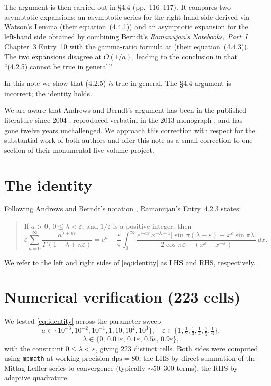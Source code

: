 \documentclass[11pt,reqno]{amsart}
\theoremstyle{definition}
\newcommand{\LHS}{\mathrm{LHS}}
\newcommand{\RHS}{\mathrm{RHS}}
\newcommand{\dps}{\mathrm{dps}}
\begin{document}
The argument is then carried out in \S4.4 (pp.~116--117). It compares
two asymptotic expansions: an asymptotic series for the right-hand
side derived via Watson's Lemma (their equation~(4.4.1)) and an
asymptotic expansion for the left-hand side obtained by combining
Berndt's \emph{Ramanujan's Notebooks, Part~I} Chapter~3 Entry~10
\cite{BerndtNB1} with the gamma-ratio formula at
\cite[p.~116, eq.~(4.4.2)]{AB2013} (their equation~(4.4.3)). The two
expansions disagree at $O(1/a)$, leading to the conclusion in
\cite[p.~117]{AB2013} that ``(4.2.5) cannot be true in general.''

In this note we show that (4.2.5) \emph{is} true in general. The
\S4.4 argument is incorrect; the identity holds.

We are aware that Andrews and Berndt's argument has been in the
published literature since 2004 \cite{Berndt2004}, reproduced
verbatim in the 2013 monograph \cite{AB2013}, and has gone twelve
years unchallenged. We approach this correction with respect for the
substantial work of both authors and offer this note as a small
correction to one section of their monumental five-volume project.

\section{The identity}

Following Andrews and Berndt's notation
\cite[p.~113, eq.~(4.2.5)]{AB2013}, Ramanujan's Entry~4.2.3 states:
\begin{quote}
If $a > 0$, $0 \le \lambda < \varepsilon$, and $1/\varepsilon$ is a
positive integer, then
\begin{equation}\label{eq:identity}
\varepsilon \sum_{n=0}^\infty
\frac{a^{\lambda + n\varepsilon}}{\Gamma(1 + \lambda + n\varepsilon)}
= e^a
- \frac{\varepsilon}{\pi} \int_0^\infty
\frac{e^{-ax}\,
x^{-\lambda - 1}
\bigl[\sin\pi(\lambda - \varepsilon) - x^\varepsilon \sin\pi\lambda\bigr]}
{2\cos\pi\varepsilon - (x^\varepsilon + x^{-\varepsilon})}\,dx.
\end{equation}
\end{quote}
We refer to the left and right sides of \cref{eq:identity} as $\LHS$
and $\RHS$, respectively.

\section{Numerical verification (223 cells)}\label{sec:numerical}

We tested \cref{eq:identity} across the parameter sweep
\[
a \in \{10^{-3}, 10^{-2}, 10^{-1}, 1, 10, 10^2, 10^3\}, \quad
\varepsilon \in \{1, \tfrac12, \tfrac13, \tfrac14, \tfrac15, \tfrac16\},
\]
\[
\lambda \in \{0,\, 0.01\varepsilon,\, 0.1\varepsilon,\, 0.5\varepsilon,\, 0.9\varepsilon\},
\]
with the constraint $0 \le \lambda < \varepsilon$, giving $223$
distinct cells. Both sides were computed using \texttt{mpmath} at
working precision $\dps = 80$; the LHS by direct summation of the
Mittag-Leffler series to convergence (typically $\sim 50$--$300$
terms), the RHS by adaptive quadrature.
\end{document}

